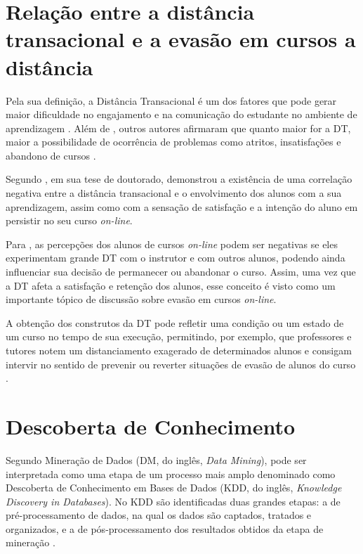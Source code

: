 \section{Relação entre a distância transacional e a evasão em cursos a distância}

Pela sua definição, a Distância Transacional é um dos fatores que pode gerar
maior dificuldade no engajamento e na comunicação do estudante no ambiente de
aprendizagem \cite{goel2012transactional}. Além de ,
outros autores afirmaram que quanto maior for a DT, maior a possibilidade de
ocorrência de problemas como atritos, insatisfações e abandono de cursos
\cite{zhang2003transactional,steinman2007educational,horzum2011developing,
mbwesa2014transactional,paul2015revisiting}.

Segundo , em sua tese de doutorado,
demonstrou a existência de uma correlação negativa entre a distância
transacional e o envolvimento dos alunos com a sua aprendizagem, assim como com
a sensação de satisfação e a intenção do aluno em persistir no seu curso
\textit{on-line}.

Para , as percepções dos alunos de cursos
\textit{on-line} podem ser negativas se eles experimentam grande DT com o
instrutor e com outros alunos, podendo ainda influenciar sua decisão de
permanecer ou abandonar o curso. Assim, uma vez que a DT afeta a satisfação e
retenção dos alunos, esse conceito é visto como um importante tópico de
discussão sobre evasão em cursos \textit{on-line}.

A obtenção dos construtos da DT pode refletir uma condição ou um estado de um
curso no tempo de sua execução, permitindo, por exemplo, que professores e
tutores notem um distanciamento exagerado de determinados alunos e consigam
intervir no sentido de prevenir ou reverter situações de evasão de alunos do
curso \cite{horzum2011developing}.

\section{Descoberta de Conhecimento}

Segundo  Mineração de Dados (DM, do inglês,
\textit{Data Mining}), pode ser interpretada como uma etapa de um processo mais
amplo denominado como Descoberta de Conhecimento em Bases de Dados (KDD, do
inglês, \textit{Knowledge Discovery in Databases}). No KDD são identificadas
duas grandes etapas: a de pré-processamento de dados, na qual os dados são
captados, tratados e organizados, e a de pós-processamento dos resultados
obtidos da etapa de mineração \cite{fayyad1996data}.

